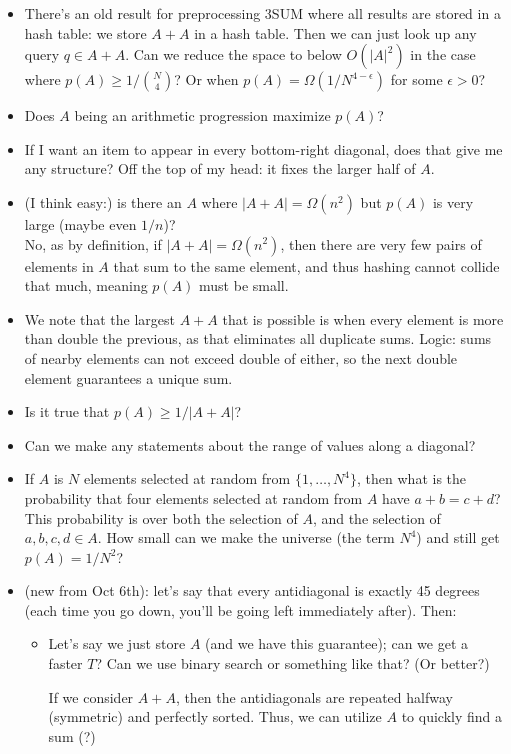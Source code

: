 \documentclass{article}
\begin{document}
\begin{itemize}
    \item There's an old result for preprocessing 3SUM where all results are stored in a hash table: we store $A+A$ in a hash table.  Then we can just look up any query $q \in A+A$.  Can we reduce the space to below $O(|A|^2)$ in the case where $p(A) \geq 1/{N\choose 4}$?  Or when $p(A) = \Omega(1/N^{4-\epsilon})$ for some $\epsilon > 0$?
    \item Does $A$ being an arithmetic progression maximize $p(A)$?
    \item If I want an item to appear in every bottom-right diagonal, does that give me any structure?  Off the top of my head: it fixes the larger half of $A$.
    \item (I think easy:) is there an $A$ where $|A+A| = \Omega(n^2)$ but $p(A)$ is very large (maybe even $1/n$)? \\
    No, as by definition, if $|A+A| = \Omega(n^2)$, then there are very few pairs of elements in $A$ that sum to the same element, and thus hashing cannot collide that much, meaning $p(A)$ must be small.
    \item We note that the largest $A+A$ that is possible is when every element is more than double the previous, as that eliminates all duplicate sums. Logic: sums of nearby elements can not exceed double of either, so the next double element guarantees a unique sum.
    \item Is it true that $p(A) \geq 1/|A+A|$?
    \item Can we make any statements about the range of values along a diagonal?
    \item If $A$ is $N$ elements selected at random from $\{1,\ldots, N^4\}$, then what is the probability that four elements selected at random from $A$ have $a + b = c+d$?  This probability is over both the selection of $A$, and the selection of $a,b,c,d\in A$.  How small can we make the universe (the term $N^4$) and still get $p(A) = 1/N^2$?
    \item (new from Oct 6th): let's say that every antidiagonal is exactly 45 degrees (each time you go down, you'll be going left immediately after).  Then:
      \begin{itemize}
        \item Let's say we just store $A$ (and we have this guarantee); can we get a faster $T$?  Can we use binary search or something like that?  (Or better?)
        
        If we consider $A+A$, then the antidiagonals are repeated halfway (symmetric) and perfectly sorted. Thus, we can utilize $A$ to quickly find a sum (?)
        

\end{itemize}
\end{itemize}
\end{document}
